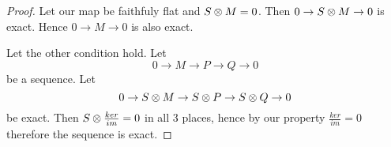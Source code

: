 



\begin{proof}
Let our map be faithfuly flat and $S\otimes M=0$. Then $0\rightarrow S\otimes M\rightarrow 0$ is exact. 
Hence $0\rightarrow M\rightarrow 0$ is also exact.

Let the other condition hold. 
Let \[0\rightarrow M \rightarrow P \rightarrow Q \rightarrow 0 \] be a sequence.
Let \[0\rightarrow S\otimes M \rightarrow S\otimes P \rightarrow S\otimes Q \rightarrow 0 \]
be exact. Then $S\otimes\frac{ker}{im}=0$ in all 3 places, hence by our property $\frac{ker}{im}=0$ therefore the sequence is exact.
\end{proof}
